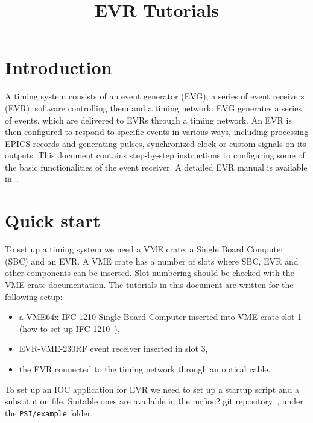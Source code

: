 \documentclass[12pt,a4paper]{article}
\title{EVR Tutorials}
\date{}
\begin{document}
\maketitle

\tableofcontents
\newpage

\section{Introduction}
A timing system consists of an event generator (EVG), a series of event receivers (EVR), software controlling them and a timing network. EVG generates a series of events, which are delivered to EVRs through a timing network. An EVR is then configured to respond to specific events in various ways, including processing EPICS records and generating pulses, synchronized clock or custom signals on its outputs.
This document contains step-by-step instructions to configuring some of the basic functionalities of the event receiver. A detailed EVR manual is available in~\cite{evr_manual}.

\section{Quick start}\label{sec:Quick start}
To set up a timing system we need a VME crate, a Single Board Computer (SBC) and an EVR. A VME crate has a number of slots where SBC, EVR and other components can be inserted. Slot numbering should be checked with the VME crate documentation. The tutorials in this document are written for the following setup:
\begin{itemize}
	\item a VME64x IFC 1210 Single Board Computer inserted into VME crate slot 1 (how to set up IFC 1210~\cite{ifc}),
	\item EVR-VME-230RF event receiver inserted in slot 3,
	\item the EVR connected to the timing network through an optical cable.
\end{itemize}

To set up an IOC application for EVR we need to set up a startup script and a substitution file. Suitable ones are available in the mrfioc2 git repository~\cite{git_mrfioc2}, under the \texttt{PSI/example} folder.
\end{document}
